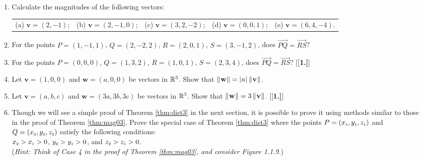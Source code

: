 \begin{enumerate}[\bfseries 1.]
 \item Calculate the magnitudes of the following vectors:\\
  \begin{tabular}{@{} l l l l l @{}}
   (a) $\mathbf{v} = (2,-1)$; & (b) $\mathbf{v} = (2,-1,0)$; & (c) $\mathbf{v} = (3,2,-2)$; & (d) $\mathbf{v} = (0,0,1)$; &
   (e) $\mathbf{v} = (6,4,-4)$.
  \end{tabular}
 \item For the points $P =(1,-1,1)$, $Q=(2,-2,2)$, $R=(2,0,1)$, $S=(3,-1,2)$, does $\overrightarrow{PQ} =
  \overrightarrow{RS}$?
 \item For the points $P =(0,0,0)$, $Q=(1,3,2)$, $R=(1,0,1)$, $S=(2,3,4)$, does $\overrightarrow{PQ} =
  \overrightarrow{RS}$?
[{[\bfseries 1.]}]
 \item Let $\mathbf{v} = (1,0,0)$ and $\mathbf{w} = (a,0,0)$ be vectors in $\mathbb{R}^{3}$. Show that
 $\lVert\mspace{1mu}\mathbf{w}\mspace{1mu}\rVert = \lvert\mspace{1mu}a\mspace{1mu}\rvert \,\lVert\mspace{1mu}\mathbf{v}\mspace{1mu}\rVert$.
 \item Let $\mathbf{v} = (a,b,c)$ and $\mathbf{w} = (3a,3b,3c)$ be vectors in $\mathbb{R}^{3}$. Show that
 $\lVert\mspace{1mu}\mathbf{w}\mspace{1mu}\rVert  = 3 \,\lVert\mspace{1mu}\mathbf{v}\mspace{1mu}\rVert$.
[{[\bfseries 1.]}]
 \piccaption[]{}
 \item Though we will see a simple proof of Theorem \ref{thm:dist3} in the next section, it is possible to prove it using
 methods similar to those in the proof of Theorem \ref{thm:mag03}.  Prove the special case of Theorem \ref{thm:dist3}
 where the points $P = (x_{\scriptscriptstyle 1},y_{\scriptscriptstyle 1},z_{\scriptscriptstyle 1})$ and $Q = (x_{\scriptscriptstyle 2},y_{\scriptscriptstyle 2},z_{\scriptscriptstyle 2})$
 satisfy the following conditions:\\
 $x_{\scriptscriptstyle 2} > x_{\scriptscriptstyle 1} > 0$, $y_{\scriptscriptstyle 2} > y_{\scriptscriptstyle 1} > 0$, and
 $z_{\scriptscriptstyle 2} > z_{\scriptscriptstyle 1} > 0$.\\
 (\emph{Hint: Think of Case 4 in the proof of Theorem \ref{thm:mag03}, and consider Figure 1.1.9.})\\
\end{enumerate}

\newpage
